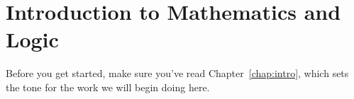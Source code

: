 \chapter{Introduction to Mathematics and Logic}

Before you get started, make sure you've read Chapter~\ref{chap:intro}, which sets the tone for the work we will begin doing here.